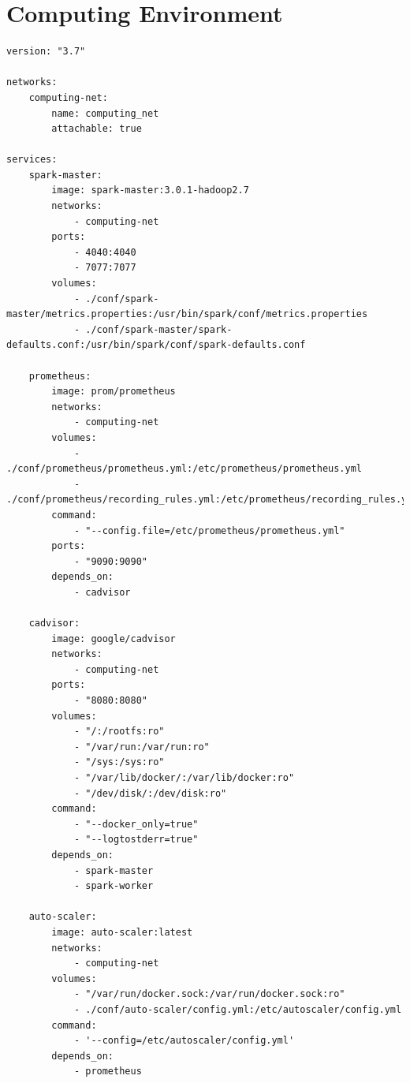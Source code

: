 \section{Computing Environment}
\begin{lstlisting}[label=lst:appendix_env_compose, caption=Computing environment docker-compose file]
version: "3.7"
 
networks:
    computing-net:
        name: computing_net
        attachable: true
 
services:
    spark-master:
        image: spark-master:3.0.1-hadoop2.7
        networks:
            - computing-net
        ports:
            - 4040:4040
            - 7077:7077
        volumes:
            - ./conf/spark-master/metrics.properties:/usr/bin/spark/conf/metrics.properties
            - ./conf/spark-master/spark-defaults.conf:/usr/bin/spark/conf/spark-defaults.conf
 
    prometheus:
        image: prom/prometheus
        networks:
            - computing-net
        volumes:
            - ./conf/prometheus/prometheus.yml:/etc/prometheus/prometheus.yml
            - ./conf/prometheus/recording_rules.yml:/etc/prometheus/recording_rules.yml
        command:
            - "--config.file=/etc/prometheus/prometheus.yml"
        ports:
            - "9090:9090"
        depends_on:
            - cadvisor
 
    cadvisor:
        image: google/cadvisor
        networks:
            - computing-net
        ports:
            - "8080:8080"
        volumes:
            - "/:/rootfs:ro"
            - "/var/run:/var/run:ro"
            - "/sys:/sys:ro"
            - "/var/lib/docker/:/var/lib/docker:ro"
            - "/dev/disk/:/dev/disk:ro"
        command:
            - "--docker_only=true"
            - "--logtostderr=true"
        depends_on:
            - spark-master
            - spark-worker
 
    auto-scaler:
        image: auto-scaler:latest
        networks:
            - computing-net
        volumes:
            - "/var/run/docker.sock:/var/run/docker.sock:ro"
            - ./conf/auto-scaler/config.yml:/etc/autoscaler/config.yml
        command:
            - '--config=/etc/autoscaler/config.yml'
        depends_on:
            - prometheus
\end{lstlisting}

